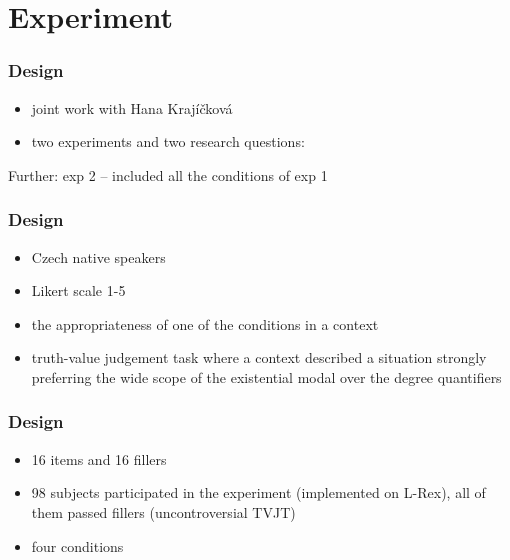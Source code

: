 \documentclass[10pt
]{beamer}
\begin{document}
\section{Experiment}

\begin{frame}
  \frametitle{Design}

\begin{itemize}
  \item joint work with Hana Krajíčková
  \item two experiments and two research questions:  
\end{itemize}
  

Further: exp 2 -- included all the conditions of exp 1

\end{frame}

\begin{frame}
  \frametitle{Design}

  \begin{itemize}
    \item Czech native speakers 
    \item Likert scale 1-5
    \item  the appropriateness of one of the conditions in a context
    \item truth-value judgement task where a context described a situation strongly preferring the wide scope of the existential modal over the degree quantifiers
  \end{itemize}
\end{frame}

\begin{frame}
  \frametitle{Design}

\begin{itemize}
    \item 16 items and 16 fillers
    \item 98 subjects participated in the experiment (implemented on L-Rex), all of them passed fillers (uncontroversial TVJT)
    \item four conditions
  \end{itemize}
  

\end{frame}
\end{document}
